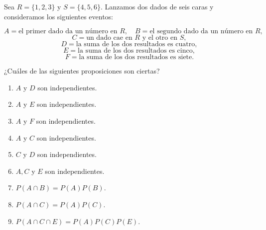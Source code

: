 \documentclass[12pt,a4paper]{article}
\begin{document}
    \begin{mdframed}[style=mdpinkbox,frametitle={Ejercicio 4}]
        Sea $R = \{1,2,3\}$ y $S = \{4,5,6\}$. Lanzamos dos dados de seis caras y consideramos los siguientes eventos:

        \[
        A = \text{el primer dado da un número en } R, \quad
        B = \text{el segundo dado da un número en } R,
        \]
        \[
        C = \text{un dado cae en } R \text{ y el otro en } S,
        \]
        \[
        D = \text{la suma de los dos resultados es cuatro},
        \]
        \[
        E = \text{la suma de los dos resultados es cinco},
        \]
        \[
        F = \text{la suma de los dos resultados es siete}.
        \]

        ¿Cuáles de las siguientes proposiciones son ciertas?

        \begin{enumerate}
            \item $A$ y $D$ son independientes.
            \item $A$ y $E$ son independientes.
            \item $A$ y $F$ son independientes.
            \item $A$ y $C$ son independientes.
            \item $C$ y $D$ son independientes.
            \item $A, C$ y $E$ son independientes.
            \item $P(A \cap B) = P(A)P(B)$.
            \item $P(A \cap C) = P(A)P(C)$.
            \item $P(A \cap C \cap E) = P(A)P(C)P(E)$.
        \end{enumerate}
    \end{mdframed}
\end{document}
